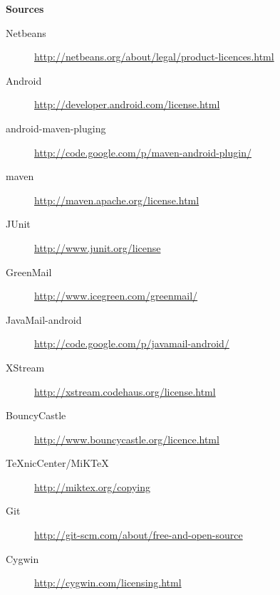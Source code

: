 	{\bf Sources}
	\begin{description}
		\item[Netbeans] \url{http://netbeans.org/about/legal/product-licences.html}
		\item[Android] \url{http://developer.android.com/license.html}
		\item[android-maven-pluging] \url{http://code.google.com/p/maven-android-plugin/}
		\item[maven] \url{http://maven.apache.org/license.html}
		\item[JUnit] \url{http://www.junit.org/license}
		\item[GreenMail] \url{http://www.icegreen.com/greenmail/}
		\item[JavaMail-android] \url{http://code.google.com/p/javamail-android/}
		\item[XStream] \url{http://xstream.codehaus.org/license.html}
		\item[BouncyCastle] \url{http://www.bouncycastle.org/licence.html}
		\item[TeXnicCenter/MiKTeX] \url{http://miktex.org/copying}
		\item[Git] \url{http://git-scm.com/about/free-and-open-source}
		\item[Cygwin] \url{http://cygwin.com/licensing.html}
	\end{description}



